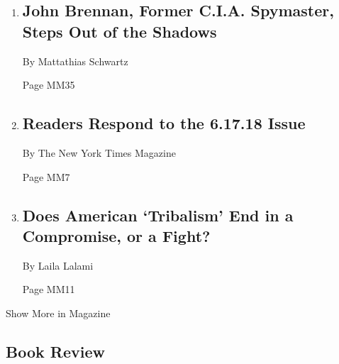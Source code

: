 \begin{enumerate}
\def\labelenumi{\arabic{enumi}.}
\item
  \href{/2018/06/27/magazine/john-brennan-president-trump-national-security-state.html}{}

  \hypertarget{john-brennan-former-cia-spymaster-steps-out-of-the-shadows-1}{%
  \subsection{John Brennan, Former C.I.A. Spymaster, Steps Out of the
  Shadows}\label{john-brennan-former-cia-spymaster-steps-out-of-the-shadows-1}}

  By Mattathias Schwartz

  Page MM35
\item
  \href{/2018/06/28/magazine/readers-respond-to-the-6-17-18-issue.html}{}

  \hypertarget{readers-respond-to-the-61718-issue}{%
  \subsection{Readers Respond to the 6.17.18
  Issue}\label{readers-respond-to-the-61718-issue}}

  By The New York Times Magazine

  Page MM7
\item
  \href{/2018/06/26/magazine/does-american-tribalism-end-in-a-compromise-or-a-fight.html}{}

  \hypertarget{does-american-tribalism-end-in-a-compromise-or-a-fight}{%
  \subsection{Does American `Tribalism' End in a Compromise, or a
  Fight?}\label{does-american-tribalism-end-in-a-compromise-or-a-fight}}

  By Laila Lalami

  Page MM11
\end{enumerate}

Show More in Magazine

\hypertarget{book-review}{%
\subsection{Book Review}\label{book-review}}

